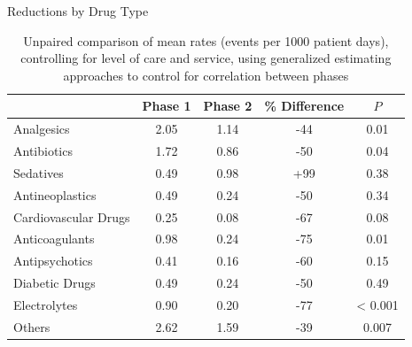 \documentclass[10pt]{beamer}
\begin{document}

%	

\begin{frame}{Reductions by Drug Type}
	\begin{table}
		\scriptsize
		\begin{tabular}{l c c c c}
			& Phase 1 & Phase 2 & \% Difference & $P$  \\ \hline \hline
			Analgesics & 2.05 & 1.14 & -44 & 0.01 \\
			Antibiotics & 1.72 & 0.86 & -50 & 0.04 \\
			Sedatives & 0.49 & 0.98 & +99 & 0.38 \\
			Antineoplastics & 0.49 & 0.24 & -50 & 0.34 \\ 
			Cardiovascular Drugs & 0.25 & 0.08 & -67 & 0.08 \\
			Anticoagulants & 0.98 & 0.24 & -75 & 0.01 \\
			Antipsychotics & 0.41 & 0.16 & -60 & 0.15 \\
			Diabetic Drugs & 0.49 & 0.24 & -50 & 0.49 \\
			Electrolytes & 0.90 & 0.20 & -77 & < 0.001 \\
			Others & 2.62 & 1.59 & -39 & 0.007 \\			
		\end{tabular}
		\caption*{Unpaired comparison of mean rates (events per 1000 patient days), controlling for level of care and service, using generalized estimating approaches to control for correlation between phases}
	\end{table}
\end{frame}


\end{document}
